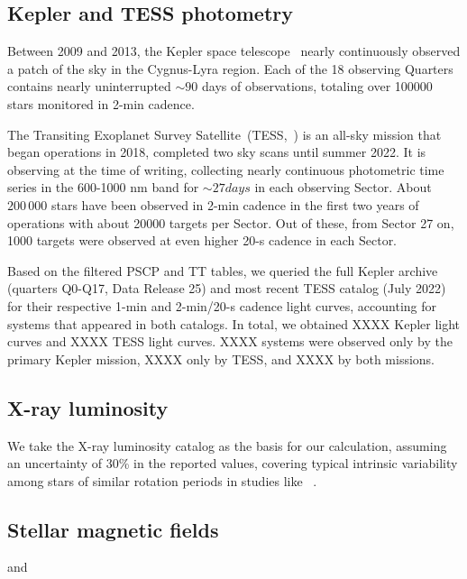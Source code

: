\documentclass[twocolumn]{aastex631}
\begin{document}
\subsection{Kepler and TESS photometry}
Between 2009 and 2013, the Kepler space telescope~\citep{koch2010kepler} nearly continuously observed a patch of the sky in the Cygnus-Lyra region. Each of the 18 observing Quarters contains nearly uninterrupted $\sim 90$ days of observations, totaling over 100000 stars monitored in 2-min cadence. 

The Transiting Exoplanet Survey Satellite~(TESS,~\cite{ricker2015transiting}) is an all-sky mission that began operations in 2018, completed two sky scans until summer 2022. It is observing at the time of writing, collecting nearly continuous photometric time series in the 600-1000 nm band for $\sim 27 days$ in each observing Sector. About $200\,000$ stars have been observed in 2-min cadence in the first two years of operations with about 20000 targets per Sector. Out of these, from Sector 27 on, 1000 targets were observed at even higher 20-s cadence in each Sector. 

Based on the filtered PSCP and TT tables, we queried the full Kepler archive (quarters Q0-Q17, Data Release 25) and most recent TESS catalog (July 2022) for their respective 1-min and 2-min/20-s cadence light curves, accounting for systems that appeared in both catalogs. In total, we obtained XXXX Kepler light curves and XXXX TESS light curves. XXXX systems were observed only by the primary Kepler mission, XXXX only by TESS, and XXXX by both missions.

\subsection{X-ray luminosity}
We take the \cite{foster2022exoplanet} X-ray luminosity catalog as the basis for our calculation, assuming an uncertainty of 30\% in the reported values, covering typical intrinsic variability among stars of similar rotation periods in studies like ~\cite{wright2011stellaractivityrotation, wright2018stellar}.

\subsection{Stellar magnetic fields}
\cite{foster2022identifying} and \cite{reiners2022magnetism} 
\end{document}
